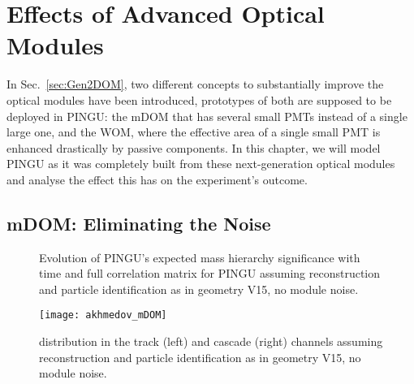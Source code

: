 \section{Effects of Advanced Optical Modules}
\label{sec:om_effects}

In Sec.~\ref{sec:Gen2DOM}, two different concepts to substantially improve the 
optical modules have been introduced, prototypes of both are supposed to be 
deployed in PINGU: the mDOM that has several small PMTs instead of a single 
large one, and the WOM, where the effective area of a single small PMT is 
enhanced drastically by passive components. In this chapter, we will model 
PINGU as it was completely built from these next-generation optical modules and 
analyse the effect this has on the experiment's outcome.

\subsection{mDOM: Eliminating the Noise}
\label{sec:mdom_effect}

\begin{figure}[thp]
 \centering
 \caption{\protect{} Evolution of PINGU's expected
          mass hierarchy significance with time and
          \protect{} full correlation matrix for
          PINGU assuming reconstruction and particle identification as in
          geometry V15, \ie no module noise.}
 \label{fig:time_covmat_mDOM}
\end{figure}

\begin{figure}[hbp]
 \centering
 \texttt{[image: akhmedov\_mDOM]}
 \caption{\delchi distribution in the track (left) and cascade (right) channels
          assuming reconstruction and particle identification as in geometry
          V15, \ie no module noise.}
 \label{fig:akhmedov_mDOM}
\end{figure}

